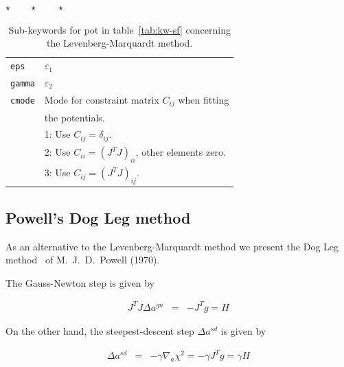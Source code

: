 \documentclass[a4paper,12pt,onecolumn]{article}
\def\eps{\varepsilon}
\newcommand{\stars}{\begin{center} \vspace{0.5cm}$\star \qquad \star \qquad \star$\vspace{0.5cm}\end{center}}
\begin{document}
\stars


\begin{table}[!h]
\caption{
Sub-keywords for \textrm{pot} in table~\ref{tab:kw-sf}
concerning the Levenberg-Marquardt method.
\label{tab:kw-lm}
}
\begin{center}
\begin{tabular}{|l|l|}
\hline
\hline
\verb+eps+          & $\eps_1$ \\
\verb+gamma+        & $\eps_2$ \\
\verb+cmode+       & Mode for constraint matrix $C_{ij}$ when fitting \\
                     & the potentials. \\
                     & 1: Use $C_{ij} = \delta_{ij}$. \\
                     & 2: Use $C_{ii} = (J^T J)_{ii}$, other elements zero. \\
                     & 3: Use $C_{ij} = (J^T J)_{ij}$. \\
\hline
\hline
\end{tabular}
\end{center}
\end{table}







\subsection{Powell's Dog Leg method}

As an alternative to the Levenberg-Marquardt method
we present the Dog Leg method~\cite{Madsen-IMM-2004}
of M.~J.~D.~Powell (1970).

The Gauss-Newton step is given by

\begin{eqnarray}
J^T J \Delta a^{gn} &=& -J^T g = H
\end{eqnarray}

On the other hand, the steepest-descent step $\Delta a^{sd}$
is given by

\begin{eqnarray}
\Delta a^{sd} &=& - \gamma \nabla_{a} \chi^2
= - \gamma J^T g
= \gamma H
\end{eqnarray}
\end{document}
